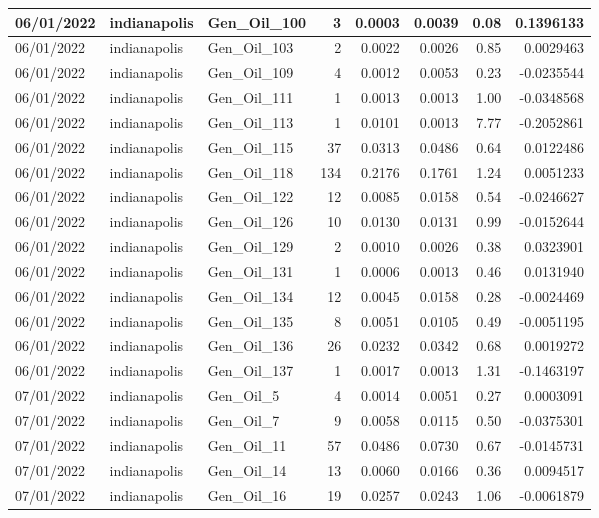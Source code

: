 \documentclass[
  letterpaper,
  DIV=11,
  numbers=noendperiod]{scrartcl}
\begin{document}
\begin{tabular}{l|l|l|r|r|r|r|r}
\hline
06/01/2022 & indianapolis & Gen\_Oil\_100 & 3 & 0.0003 & 0.0039 & 0.08 & 0.1396133\\
\hline
06/01/2022 & indianapolis & Gen\_Oil\_103 & 2 & 0.0022 & 0.0026 & 0.85 & 0.0029463\\
\hline
06/01/2022 & indianapolis & Gen\_Oil\_109 & 4 & 0.0012 & 0.0053 & 0.23 & -0.0235544\\
\hline
06/01/2022 & indianapolis & Gen\_Oil\_111 & 1 & 0.0013 & 0.0013 & 1.00 & -0.0348568\\
\hline
06/01/2022 & indianapolis & Gen\_Oil\_113 & 1 & 0.0101 & 0.0013 & 7.77 & -0.2052861\\
\hline
06/01/2022 & indianapolis & Gen\_Oil\_115 & 37 & 0.0313 & 0.0486 & 0.64 & 0.0122486\\
\hline
06/01/2022 & indianapolis & Gen\_Oil\_118 & 134 & 0.2176 & 0.1761 & 1.24 & 0.0051233\\
\hline
06/01/2022 & indianapolis & Gen\_Oil\_122 & 12 & 0.0085 & 0.0158 & 0.54 & -0.0246627\\
\hline
06/01/2022 & indianapolis & Gen\_Oil\_126 & 10 & 0.0130 & 0.0131 & 0.99 & -0.0152644\\
\hline
06/01/2022 & indianapolis & Gen\_Oil\_129 & 2 & 0.0010 & 0.0026 & 0.38 & 0.0323901\\
\hline
06/01/2022 & indianapolis & Gen\_Oil\_131 & 1 & 0.0006 & 0.0013 & 0.46 & 0.0131940\\
\hline
06/01/2022 & indianapolis & Gen\_Oil\_134 & 12 & 0.0045 & 0.0158 & 0.28 & -0.0024469\\
\hline
06/01/2022 & indianapolis & Gen\_Oil\_135 & 8 & 0.0051 & 0.0105 & 0.49 & -0.0051195\\
\hline
06/01/2022 & indianapolis & Gen\_Oil\_136 & 26 & 0.0232 & 0.0342 & 0.68 & 0.0019272\\
\hline
06/01/2022 & indianapolis & Gen\_Oil\_137 & 1 & 0.0017 & 0.0013 & 1.31 & -0.1463197\\
\hline
07/01/2022 & indianapolis & Gen\_Oil\_5 & 4 & 0.0014 & 0.0051 & 0.27 & 0.0003091\\
\hline
07/01/2022 & indianapolis & Gen\_Oil\_7 & 9 & 0.0058 & 0.0115 & 0.50 & -0.0375301\\
\hline
07/01/2022 & indianapolis & Gen\_Oil\_11 & 57 & 0.0486 & 0.0730 & 0.67 & -0.0145731\\
\hline
07/01/2022 & indianapolis & Gen\_Oil\_14 & 13 & 0.0060 & 0.0166 & 0.36 & 0.0094517\\
\hline
07/01/2022 & indianapolis & Gen\_Oil\_16 & 19 & 0.0257 & 0.0243 & 1.06 & -0.0061879\\

\end{tabular}
\end{document}
